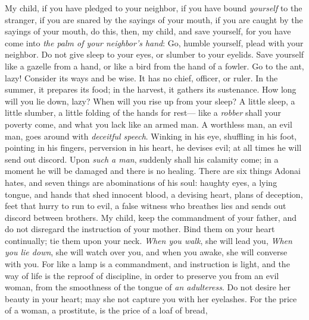 \begin{biblechapter} %
 My child, if you have pledged to your neighbor, 
if you have bound \textit{yourself} to the stranger,
\verse if you are snared by the sayings of your mouth, 
if you are caught by the sayings of your mouth,
\verse do this, then, my child, and save yourself, 
for you have come into \textit{the palm of your neighbor’s hand}: 
Go, humble yourself, plead with your neighbor.
\verse Do not give sleep to your eyes, 
or slumber to your eyelids.
\verse Save yourself like a gazelle from a hand, 
or like a bird from the hand of a fowler.
 Go to the ant, lazy! 
Consider its ways and be wise.
\verse It has no chief, 
officer, or ruler.
\verse In the summer, it prepares its food; 
in the harvest, it gathers its sustenance.
\verse How long will you lie down, lazy? 
When will you rise up from your sleep?
\verse A little sleep, a little slumber, 
a little folding of the hands for rest—
\verse like a \textit{robber} shall your poverty come, 
and what you lack like an armed man.
 A worthless man, an evil man, 
goes around with \textit{deceitful speech}.
\verse Winking in his eye, shuffling in his foot, 
pointing in his fingers,
\verse perversion in his heart, he devises evil; 
at all times he will send out discord.
\verse Upon \textit{such a man}, suddenly shall his calamity come; 
in a moment he will be damaged and there is no healing.
 There are six things Adonai hates, 
and seven things are abominations of his soul:
\verse haughty eyes, a lying tongue, 
and hands that shed innocent blood,
\verse a devising heart, plans of deception, 
feet that hurry to run to evil,
\verse a false witness who breathes lies 
and sends out discord between brothers.
 My child, keep the commandment of your father, 
and do not disregard the instruction of your mother.
\verse Bind them on your heart continually; 
tie them upon your neck.
\verse \textit{When you walk}, she will lead you, 
\textit{When you lie down}, she will watch over you, 
and when you awake, she will converse with you.
\verse For like a lamp is a commandment, and instruction is light, 
and the way of life is the reproof of discipline,
\verse in order to preserve you from an evil woman, 
from the smoothness of the tongue of \textit{an adulteress}.
\verse Do not desire her beauty in your heart; 
may she not capture you with her eyelashes.
\verse For the price of a woman, a prostitute, is the price of a loaf of bread, 

\end{biblechapter}
